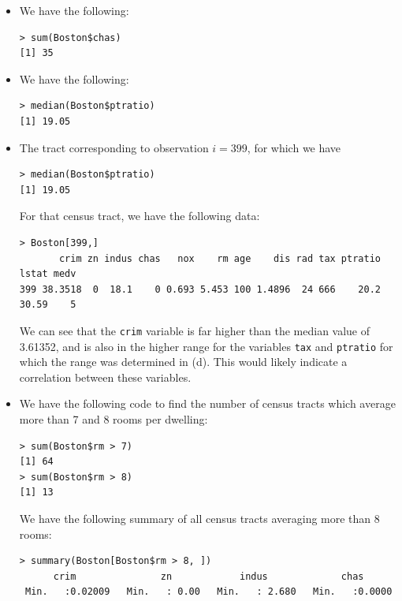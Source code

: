 \begin{itemize}
\begin{lstlisting}
> summary(Boston$tax)
   Min. 1st Qu.  Median    Mean 3rd Qu.    Max.
  187.0   279.0   330.0   408.2   666.0   711.0
        \end{lstlisting}
        The same applies to pupil-teacher ratios:
        \begin{lstlisting}
> summary(Boston$ptratio)
   Min. 1st Qu.  Median    Mean 3rd Qu.    Max.
  12.60   17.40   19.05   18.46   20.20   22.00
        \end{lstlisting}
    \item[(e)]
        We have the following:
        \begin{lstlisting}
> sum(Boston$chas)
[1] 35
        \end{lstlisting}
    \item[(f)]
        We have the following:
        \begin{lstlisting}
> median(Boston$ptratio)
[1] 19.05
        \end{lstlisting}
    \item[(g)]
        The tract corresponding to observation $i = 399$, for which we have
        \begin{lstlisting}
> median(Boston$ptratio)
[1] 19.05
        \end{lstlisting}
        For that census tract, we have the following data:
        \begin{lstlisting}
> Boston[399,]
       crim zn indus chas   nox    rm age    dis rad tax ptratio lstat medv
399 38.3518  0  18.1    0 0.693 5.453 100 1.4896  24 666    20.2 30.59    5
        \end{lstlisting}
        We can see that the \verb|crim| variable is far higher than the median
        value of 3.61352, and is also in the higher range for the variables
        \verb|tax| and \verb|ptratio| for which the range was determined in (d).
        This would likely indicate a correlation between these variables.
    \item[(h)]
        We have the following code to find the number of census tracts which
        average more than 7 and 8 rooms per dwelling:
        \begin{lstlisting}
> sum(Boston$rm > 7)
[1] 64
> sum(Boston$rm > 8)
[1] 13
        \end{lstlisting}
        We have the following summary of all census tracts averaging more than 8
        rooms:
        \begin{lstlisting}
> summary(Boston[Boston$rm > 8, ])
      crim               zn            indus             chas
 Min.   :0.02009   Min.   : 0.00   Min.   : 2.680   Min.   :0.0000

\end{lstlisting}
\end{itemize}
